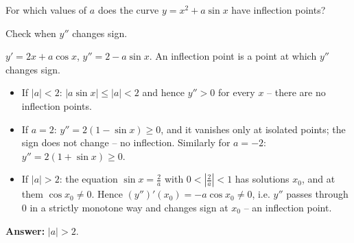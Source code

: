 
\begin{question}
For which values of $a$ does the curve $y=x^2+a\sin x$ have inflection points?
\end{question}

\begin{hint}
Check when $y''$ changes sign.
\end{hint}

\begin{solution}
$y'=2x+a\cos x$, $y''=2-a\sin x$. An inflection point is a point at which $y''$ changes sign.
\begin{itemize}
  \item If $|a|<2$: $|a\sin x|\le|a|<2$ and hence $y''>0$ for every $x$ -- there are no inflection points.
  \item If $a=2$: $y''=2(1-\sin x)\ge0$, and it vanishes only at isolated points; the sign does not change -- no inflection. Similarly for $a=-2$: $y''=2(1+\sin x)\ge0$.
  \item If $|a|>2$: the equation $\sin x=\frac2a$ with $0<\left|\frac2a\right|<1$ has solutions $x_0$, and at them $\cos x_0\ne0$. Hence $(y'')'(x_0)=-a\cos x_0\ne0$, i.e. $y''$ passes through $0$ in a strictly monotone way and changes sign at $x_0$ -- an inflection point.
\end{itemize}
\textbf{Answer:} $|a|>2$.
\end{solution}
